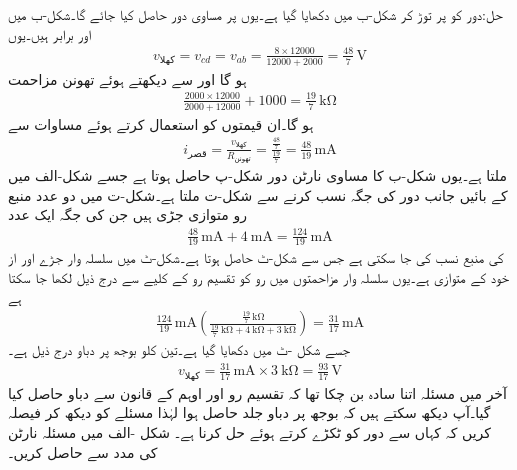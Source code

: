 حل:دور کو  پر توڑ  کر شکل-ب میں دکھایا گیا ہے۔یوں   پر مساوی دور حاصل کیا جائے گا۔شکل-ب میں  اور  برابر ہیں۔یوں
\begin{align*}
v_{\text{کھلا}} = v_{cd}= v_{ab} =\frac{8\times 12000}{12000+2000}=\frac{48}{7} \, \si{\volt}
\end{align*}
ہو گا اور   سے دیکھتے ہوئے تھونن مزاحمت
\begin{align*}
\frac{2000\times 12000}{2000+12000}+1000=\frac{19}{7}\, \si{\kilo\ohm}
\end{align*}
ہو گا۔ان قیمتوں کو استعمال کرتے ہوئے مساوات   سے
\begin{align*}
i_{\text{قصر}} =\frac{v_{\text{کھلا}}}{R_{\text{تھونن}}} =\frac{\frac{48}{7}}{\frac{19}{7}}=\frac{48}{19}\, \si{\milli\ampere}
\end{align*}
ملتا ہے۔یوں شکل-ب کا مساوی نارٹن دور شکل-پ حاصل ہوتا ہے جسے شکل-الف میں  کے بائیں جانب دور کی جگہ نسب کرنے سے شکل-ت ملتا ہے۔شکل-ت میں دو عدد منبع رو متوازی جڑی ہیں جن کی جگہ ایک عدد
\begin{align*}
\frac{48}{19} \, \si{\milli\ampere}+\SI{4}{\milli\ampere}=\frac{124}{19} \, \si{\milli\ampere}
\end{align*}
  کی منبع نسب کی جا سکتی ہے  جس سے شکل-ٹ حاصل ہوتا ہے۔شکل-ٹ میں سلسلہ وار جڑے  اور  از خود  کے متوازی ہے۔یوں سلسلہ وار مزاحمتوں میں رو کو تقسیم رو کے کلیے سے درج ذیل لکھا جا سکتا ہے
\begin{align*}
\frac{124}{19}\,\si{\milli\ampere}\left(\frac{\frac{19}{7} \, \si{\kilo\ohm}}{\frac{19}{7} \, \si{\kilo\ohm}+\SI{4}{\kilo\ohm}+\SI{3}{\kilo\ohm}} \right)=\frac{31}{17} \, \si{\milli\ampere}
\end{align*}
جسے شکل -ٹ میں دکھایا گیا ہے۔تین کلو  بوجھ پر دباو درج ذیل ہے۔
\begin{align*}
v_{\text{کھلا}}=\frac{31}{17} \, \si{\milli\ampere} \times \SI{3}{\kilo\ohm}=\frac{93}{17} \, \si{\volt}
\end{align*}
آخر میں مسئلہ اتنا سادہ بن چکا تھا کہ تقسیم رو اور اوہم کے قانون سے دباو حاصل کیا گیا۔آپ دیکھ سکتے ہیں کہ بوجھ پر دباو  جلد حاصل ہوا لہٰذا مسئلے کو دیکھ کر فیصلہ کریں کہ کہاں سے دور کو ٹکڑے کرتے ہوئے حل کرنا ہے۔
شکل -الف میں مسئلہ نارٹن کی مدد سے  حاصل کریں۔

